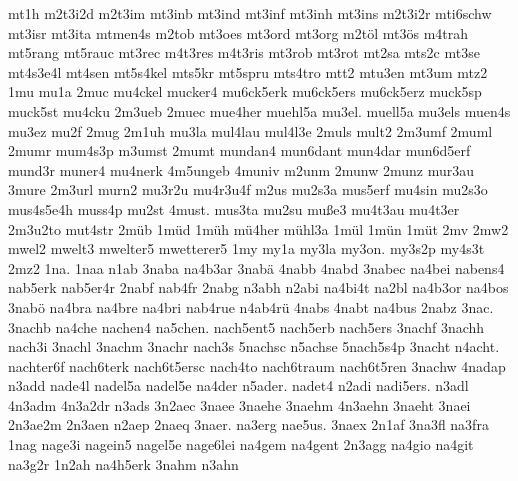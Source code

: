 {    mt1h
    m2t3i2d
    m2t3im
    mt3inb
    mt3ind
    mt3inf
    mt3inh
    mt3ins
    m2t3i2r
    mti6schw
    mt3isr
    mt3ita
    mtmen4s
    m2tob
    mt3oes
    mt3ord
    mt3org
    m2töl
    mt3ös
    m4trah
    mt5rang
    mt5rauc
    mt3rec
    m4t3res
    m4t3ris
    mt3rob
    mt3rot
    mt2sa
    mts2c
    mt3se
    mt4s3e4l
    mt4sen
    mt5s4kel
    mts5kr
    mt5spru
    mts4tro
    mtt2
    mtu3en
    mt3um
    mtz2
    1mu
    mu1a
    2muc
    mu4ckel
    mucker4
    mu6ck5erk
    mu6ck5ers
    mu6ck5erz
    muck5sp
    muck5st
    mu4cku
    2m3ueb
    2muec
    mue4her
    muehl5a
    mu3el.
    muell5a
    mu3els
    muen4s
    mu3ez
    mu2f
    2mug
    2m1uh
    mu3la
    mul4lau
    mul4l3e
    2muls
    mult2
    2m3umf
    2muml
    2mumr
    mum4s3p
    m3umst
    2mumt
    mundan4
    mun6dant
    mun4dar
    mun6d5erf
    mund3r
    muner4
    mu4nerk
    4m5ungeb
    4muniv
    m2unm
    2munw
    2munz
    mur3au
    3mure
    2m3url
    murn2
    mu3r2u
    mu4r3u4f
    m2us
    mu2s3a
    mus5erf
    mu4sin
    mu2s3o
    mus4s5e4h
    muss4p
    mu2st
    4must.
    mus3ta
    mu2su
    muße3
    mu4t3au
    mu4t3er
    2m3u2to
    mut4str
    2müb
    1müd
    1müh
    mü4her
    mühl3a
    1mül
    1mün
    1müt
    2mv
    2mw2
    mwel2
    mwelt3
    mwelter5
    mwetterer5
    1my
    my1a
    my3la
    my3on.
    my3s2p
    my4s3t
    2mz2
    1na.
    1naa
    n1ab
    3naba
    na4b3ar
    3nabä
    4nabb
    4nabd
    3nabec
    na4bei
    nabens4
    nab5erk
    nab5er4r
    2nabf
    nab4fr
    2nabg
    n3abh
    n2abi
    na4bi4t
    na2bl
    na4b3or
    na4bos
    3nabö
    na4bra
    na4bre
    na4bri
    nab4rue
    n4ab4rü
    4nabs
    4nabt
    na4bus
    2nabz
    3nac.
    3nachb
    na4che
    nachen4
    na5chen.
    nach5ent5
    nach5erb
    nach5ers
    3nachf
    3nachh
    nach3i
    3nachl
    3nachm
    3nachr
    nach3s
    5nachsc
    n5achse
    5nach5s4p
    3nacht
    n4acht.
    nachter6f
    nach6terk
    nach6t5ersc
    nach4to
    nach6traum
    nach6t5ren
    3nachw
    4nadap
    n3add
    nade4l
    nadel5a
    nadel5e
    na4der
    n5ader.
    nadet4
    n2adi
    nadi5ers.
    n3adl
    4n3adm
    4n3a2dr
    n3ads
    3n2aec
    3naee
    3naehe
    3naehm
    4n3aehn
    3naeht
    3naei
    2n3ae2m
    2n3aen
    n2aep
    2naeq
    3naer.
    na3erg
    nae5us.
    3naex
    2n1af
    3na3fl
    na3fra
    1nag
    nage3i
    nagein5
    nagel5e
    nage6lei
    na4gem
    na4gent
    2n3agg
    na4gio
    na4git
    na3g2r
    1n2ah
    na4h5erk
    3nahm
    n3ahn
}
